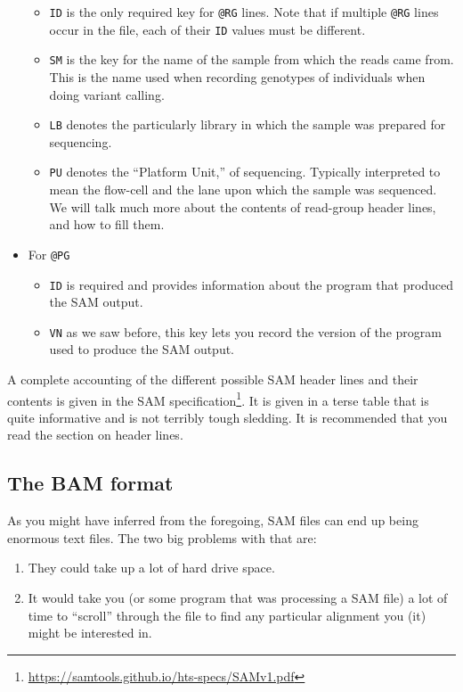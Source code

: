 \documentclass[]{krantz}
\providecommand{\tightlist}{%
  \setlength{\itemsep}{0pt}\setlength{\parskip}{0pt}}
\renewcommand{\href}[2]{#2\footnote{\url{#1}}}
\begin{document}
\begin{itemize}
  \begin{itemize}
  \tightlist
  \item
    \texttt{ID} is the only required key for \texttt{@RG} lines. Note that if multiple \texttt{@RG} lines occur in the file,
    each of their \texttt{ID} values must be different.
  \item
    \texttt{SM} is the key for the name of the sample from which the reads came from. This is the name
    used when recording genotypes of individuals when doing variant calling.
  \item
    \texttt{LB} denotes the particularly library in which the sample was prepared for sequencing.
  \item
    \texttt{PU} denotes the ``Platform Unit,'' of sequencing. Typically interpreted to mean the flow-cell and
    the lane upon which the sample was sequenced. We will talk much more about the contents of read-group
    header lines, and how to fill them.
  \end{itemize}
\item
  For \texttt{@PG}

  \begin{itemize}
  \tightlist
  \item
    \texttt{ID} is required and provides information about the program that produced the SAM output.
  \item
    \texttt{VN} as we saw before, this key lets you record the version of the program used to produce the
    SAM output.
  \end{itemize}
\end{itemize}

A complete accounting of the different possible SAM header lines and their contents is given
in the \href{https://samtools.github.io/hts-specs/SAMv1.pdf}{SAM specification}. It is given in a
terse table that is quite informative and is not terribly tough sledding. It is recommended that
you read the section on header lines.

\hypertarget{the-bam-format}{%
\subsection{The BAM format}\label{the-bam-format}}

As you might have inferred from the foregoing, SAM files can end up being enormous
text files. The two big problems with that are:

\begin{enumerate}
\def\labelenumi{\arabic{enumi}.}
\tightlist
\item
  They could take up a lot of hard drive space.
\item
  It would take you (or some program that was processing a SAM file)
  a lot of time to ``scroll'' through the file to find any particular alignment you (it)
  might be interested in.
\end{enumerate}
\end{document}
